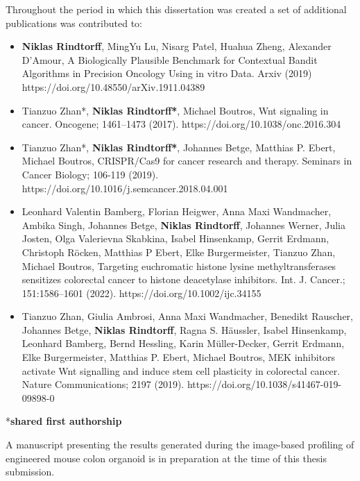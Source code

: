 \begin{flushleft}
Throughout the period in which this dissertation was created a set of additional publications was contributed to: 
\begin{itemize} 
    \item \textbf{Niklas Rindtorff}, MingYu Lu, Nisarg Patel, Huahua Zheng, Alexander D'Amour, A Biologically Plausible Benchmark for Contextual Bandit Algorithms in Precision Oncology Using in vitro Data. Arxiv (2019) https://doi.org/10.48550/arXiv.1911.04389
    \item Tianzuo Zhan*, \textbf{Niklas Rindtorff*}, Michael Boutros, Wnt signaling in cancer. Oncogene; 1461–1473 (2017). https://doi.org/10.1038/onc.2016.304
    \item Tianzuo Zhan*, \textbf{Niklas Rindtorff*}, Johannes Betge, Matthias P. Ebert, Michael Boutros, CRISPR/Cas9 for cancer research and therapy. Seminars in Cancer Biology; 106-119 (2019). https://doi.org/10.1016/j.semcancer.2018.04.001
    \item Leonhard Valentin Bamberg, Florian Heigwer, Anna Maxi Wandmacher, Ambika Singh, Johannes Betge, \textbf{Niklas Rindtorff}, Johannes Werner, Julia Josten, Olga Valerievna Skabkina, Isabel Hinsenkamp, Gerrit Erdmann, Christoph Röcken, Matthias P Ebert, Elke Burgermeister, Tianzuo Zhan, Michael Boutros, Targeting euchromatic histone lysine methyltransferases
sensitizes colorectal cancer to histone deacetylase inhibitors. Int. J. Cancer.; 151:1586–1601 (2022). https://doi.org/10.1002/ijc.34155
    \item Tianzuo Zhan, Giulia Ambrosi, Anna Maxi Wandmacher, Benedikt Rauscher, Johannes Betge, \textbf{Niklas Rindtorff}, Ragna S. Häussler, Isabel Hinsenkamp, Leonhard Bamberg, Bernd Hessling, Karin Müller-Decker, Gerrit Erdmann, Elke Burgermeister, Matthias P. Ebert, Michael Boutros, MEK inhibitors activate Wnt signalling and induce stem cell plasticity in colorectal cancer. Nature Communications; 2197 (2019). https://doi.org/10.1038/s41467-019-09898-0
\end{itemize}
*\textbf{shared first authorship}
\bigbreak

A manuscript presenting the results generated during the image-based profiling of engineered mouse colon organoid is in preparation at the time of this thesis submission.
\end{flushleft}
